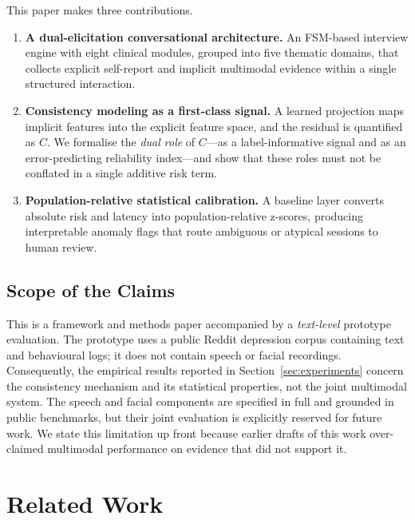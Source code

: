 \documentclass[12pt]{article}
\begin{document}
This paper makes three contributions.
\begin{enumerate}
  \item \textbf{A dual-elicitation conversational architecture.} An
        FSM-based interview engine with eight clinical modules, grouped
        into five thematic domains, that collects explicit self-report
        and implicit multimodal evidence within a single structured
        interaction.
  \item \textbf{Consistency modeling as a first-class signal.} A
        learned projection maps implicit features into the explicit
        feature space, and the residual is quantified as $C$. We
        formalise the \emph{dual role} of $C$---as a label-informative
        signal and as an error-predicting reliability index---and show
        that these roles must not be conflated in a single additive
        risk term.
  \item \textbf{Population-relative statistical calibration.} A
        baseline layer converts absolute risk and latency into
        population-relative z-scores, producing interpretable anomaly
        flags that route ambiguous or atypical sessions to human
        review.
\end{enumerate}

\subsection{Scope of the Claims}
\label{sec:scope}

This is a framework and methods paper accompanied by a \emph{text-level}
prototype evaluation. The prototype uses a public Reddit depression
corpus containing text and behavioural logs; it does not contain speech
or facial recordings. Consequently, the empirical results reported in
Section~\ref{sec:experiments} concern the consistency mechanism and its
statistical properties, not the joint multimodal system. The speech and
facial components are specified in full and grounded in public
benchmarks, but their joint evaluation is explicitly reserved for future
work. We state this limitation up front because earlier drafts of this
work over-claimed multimodal performance on evidence that did not
support it.

\section{Related Work}
\end{document}
